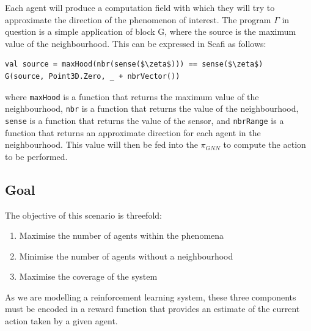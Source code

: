 \documentclass[conference]{IEEEtran}
\begin{document}
Each agent will produce a computation field with which they will try to approximate the direction of the phenomenon of interest. 
%
The program $\Gamma$ in question is a simple application of block G, where the source is the maximum value of the neighbourhood. 
This can be expressed in Scafi as follows:
\begin{lstlisting}[mathescape=true]
val source = maxHood(nbr(sense($\zeta$))) == sense($\zeta$)
G(source, Point3D.Zero, _ + nbrVector())
\end{lstlisting}
where \texttt{maxHood} is a function that returns the maximum value of the neighbourhood, 
 \texttt{nbr} is a function that returns the value of the neighbourhood, 
\texttt{sense} is a function that returns the value of the sensor, and
\texttt{nbrRange} is a function that returns an approximate direction for each agent in the neighbourhood.
%
This value will then be fed into the $\pi_{GNN}$ to compute the action to be performed.

 
\subsection{Goal}
 The objective of this scenario is threefold:
\begin{enumerate}
\item Maximise the number of agents within the phenomena
\item Minimise the number of agents without a neighbourhood
\item Maximise the coverage of the system
\end{enumerate}
 
As we are modelling a reinforcement learning system, 
 these three components must be encoded in a reward function 
 that provides an estimate of the current action taken by a given agent.
 
\end{document}
